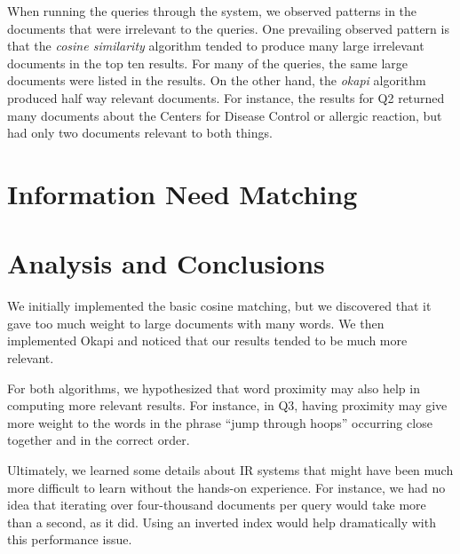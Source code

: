 \documentclass{article}
\begin{document}
\hfill

When running the queries through the system, we observed patterns in the documents that were irrelevant to the queries. One prevailing observed pattern is that the \textit{cosine similarity} algorithm tended to produce many large irrelevant documents in the top ten results. For many of the queries, the same large documents were listed in the results. On the other hand, the \textit{okapi} algorithm produced half way relevant documents. For instance, the results for Q2 returned many documents about the Centers for Disease Control or allergic reaction, but had only two documents relevant to both things.

\section{Information Need Matching}

\section{Analysis and Conclusions}
We initially implemented the basic cosine matching, but we discovered that it gave too much weight to large documents with many words. We then implemented Okapi and noticed that our results tended to be much more relevant.

For both algorithms, we hypothesized that word proximity may also help in computing more relevant results. For instance, in Q3, having proximity may give more weight to the words in the phrase ``jump through hoops'' occurring close together and in the correct order.

Ultimately, we learned some details about IR systems that might have been much more difficult to learn without the hands-on experience. For instance, we had no idea that iterating over four-thousand documents per query would take more than a second, as it did. Using an inverted index would help dramatically with this performance issue.
\end{document}
